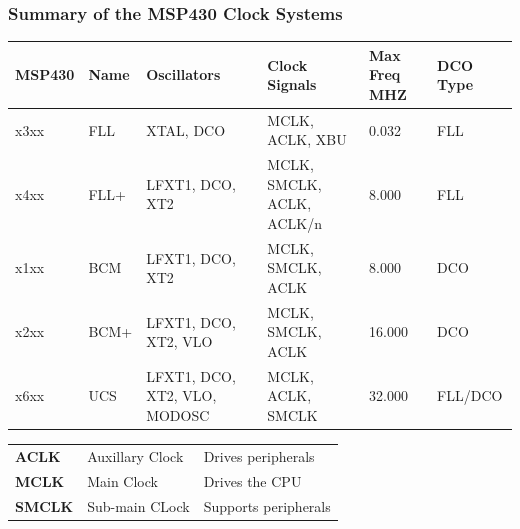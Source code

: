 \subsubsection{Summary of the MSP430 Clock Systems}
{\small 
\begin{tabular}{llllll}
    \textbf{MSP430}& \textbf{Name} & \textbf{Oscillators} & \textbf{Clock Signals} & \textbf{Max Freq MHZ} & \textbf{DCO Type} \\
    \hline
    x3xx           & FLL           & XTAL, DCO            & MCLK, ACLK, XBU        & 0.032                 & FLL                \\
    x4xx           & FLL+          & LFXT1, DCO, XT2      & MCLK, SMCLK, ACLK, ACLK/n  & 8.000             & FLL                \\
    x1xx           & BCM           & LFXT1, DCO, XT2      & MCLK, SMCLK, ACLK          & 8.000             & DCO                \\
    x2xx           & BCM+          & LFXT1, DCO, XT2, VLO & MCLK, SMCLK, ACLK          & 16.000            & DCO                \\
    x6xx           & UCS           & LFXT1, DCO, XT2, VLO, MODOSC & MCLK, ACLK, SMCLK  & 32.000            & FLL/DCO            \\
\end{tabular}
}

\begin{tabular}{lll}
    \textbf{ACLK} & Auxillary Clock  & Drives peripherals\\
    \textbf{MCLK} & Main Clock       & Drives the CPU \\
    \textbf{SMCLK}& Sub-main CLock   & Supports peripherals\\
\end{tabular}
\clearpage
\pagebreak